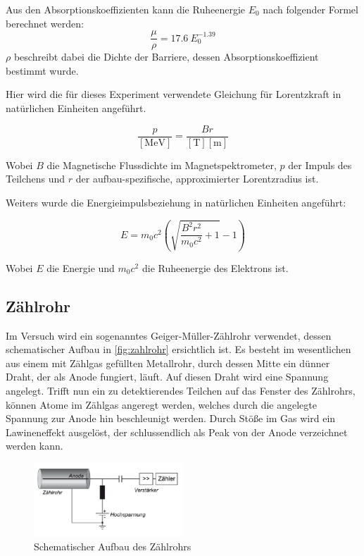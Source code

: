 \documentclass[12pt,english,ngerman]{scrartcl}
\begin{document}
Aus den Absorptionskoeffizienten kann die Ruheenergie \(E_0\) nach folgender
Formel berechnet werden:
\begin{equation}
	\frac{\mu}{\rho} = 17.6 \ E_0^{-1.39}
	\label{eq:Endpunktsenergie}
\end{equation}
\(\rho\) beschreibt dabei die Dichte der Barriere, dessen
Absorptionskoeffizient bestimmt wurde.~\cite{kuchling}

Hier wird die für dieses Experiment verwendete Gleichung für Lorentzkraft in
natürlichen Einheiten angeführt.

\begin{equation}
	\frac{p}{[\si{\mega\electronvolt}]} =  \frac{Br}{[\si{\tesla}][\si{\meter}]}
	\label{eq:lorentzimpuls}
\end{equation}

Wobei $B$ die Magnetische Flussdichte im Magnetspektrometer, $p$ der Impuls des
Teilchens und $r$ der aufbau-spezifische, approximierter Lorentzradius ist.

Weiters wurde die Energieimpulsbeziehung in natürlichen Einheiten angeführt:

\begin{equation}
	E = m_0 c^2 \left(\sqrt{\frac{ B^{2} r^{2}}{m_0 c^2} + 1} - 1 \right)
	\label{eq:energieimpulsrelation}
\end{equation}

Wobei $E$ die Energie und $m_0 c^2$ die Ruheenergie des Elektrons
ist.\cite{kuchling}

\subsection{Zählrohr}

Im Versuch wird ein sogenanntes Geiger-Müller-Zählrohr verwendet, dessen
schematischer Aufbau in \autoref{fig:zahlrohr} ersichtlich ist. Es besteht im
wesentlichen aus einem mit Zählgas gefüllten Metallrohr, durch dessen Mitte ein
dünner Draht, der als Anode fungiert, läuft. Auf diesen Draht wird eine
Spannung angelegt. Trifft nun ein zu detektierendes Teilchen auf das Fenster
des Zählrohrs, können Atome im Zählgas angeregt werden, welches durch die
angelegte Spannung zur Anode hin beschleunigt werden. Durch Stöße im Gas wird
ein Lawineneffekt ausgelöst, der schlussendlich als Peak von der Anode
verzeichnet werden kann.

\begin{figure}[H]
	\begin{center}
		\includegraphics[width = 0.5\textwidth]{./figures/zahlrohr.png}
	\end{center}
	\caption{Schematischer Aufbau des Zählrohrs~\cite[]{zaehlrohrvorbereitung}}\label{fig:zahlrohr}
\end{figure}
\end{document}
